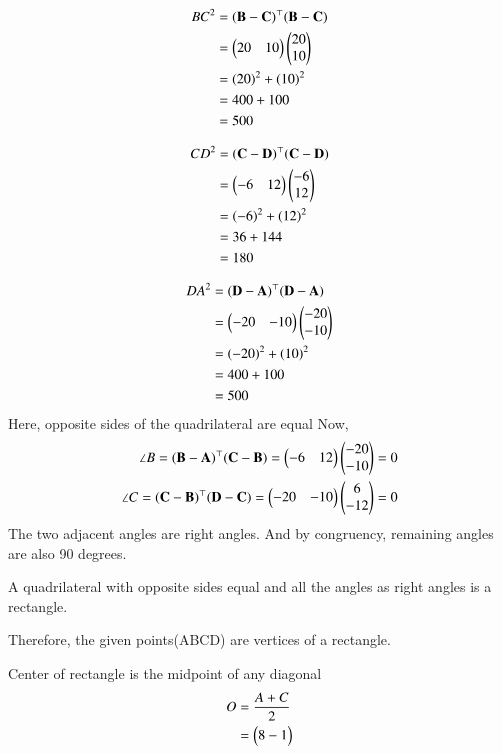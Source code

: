 \documentclass[journal,12pt,twocolumn]{IEEEtran}
\begin{document}
\begin{align}
    BC^2 &= (\mathbf{\mathbf{B} - \mathbf{C}})^\top(\mathbf{\mathbf{B} - \mathbf{C}}) \\
    &=  \begin{pmatrix}20 & 10\end{pmatrix} \begin{pmatrix}20 \\ 10\end{pmatrix}\\
    &= (20)^{2}+ (10)^{2}\\
    &= 400 + 100\\
    &= 500
\end{align}

\begin{align}
    CD^2 &= (\mathbf{\mathbf{C} - \mathbf{D}})^\top(\mathbf{\mathbf{C} - \mathbf{D}}) \\
    &=  \begin{pmatrix}-6 & 12\end{pmatrix} \begin{pmatrix}-6 \\ 12\end{pmatrix}\\
    &= (-6)^{2}+ (12)^{2}\\
    &= 36 + 144\\
    &= 180
\end{align}

\begin{align}
    DA^2 &= (\mathbf{\mathbf{D} - \mathbf{A}})^\top(\mathbf{\mathbf{D} - \mathbf{A}}) \\
    &=  \begin{pmatrix}-20 & -10\end{pmatrix} \begin{pmatrix}-20 \\ -10\end{pmatrix}\\
    &= (-20)^{2}+ (10)^{2}\\
    &= 400 + 100\\
    &= 500
\end{align}
Here, opposite sides of the quadrilateral are equal
Now,
\begin{align}
    \angle B = (\mathbf{\mathbf{B} - \mathbf{A}})^\top(\mathbf{\mathbf{C} - \mathbf{B}}) = \begin{pmatrix}-6 & 12\end{pmatrix} \begin{pmatrix}-20 \\ -10\end{pmatrix}
    &= 0\\
    \angle C = (\mathbf{\mathbf{C} - \mathbf{B}})^\top(\mathbf{\mathbf{D} - \mathbf{C}}) = \begin{pmatrix}-20 & -10\end{pmatrix} \begin{pmatrix}6 \\ -12\end{pmatrix}
    &= 0
\end{align}
The two adjacent angles are right angles. And by congruency, remaining angles are also 90 degrees.

A quadrilateral with opposite sides equal and all the angles as right angles is a rectangle.

Therefore, the given points(ABCD) are vertices of a rectangle.

Center of rectangle is the midpoint of any diagonal
\begin{align}
    O &= \frac{A+C}{2} \\
    &= \begin{pmatrix}8 -1\end{pmatrix}
\end{align}
\end{document}
